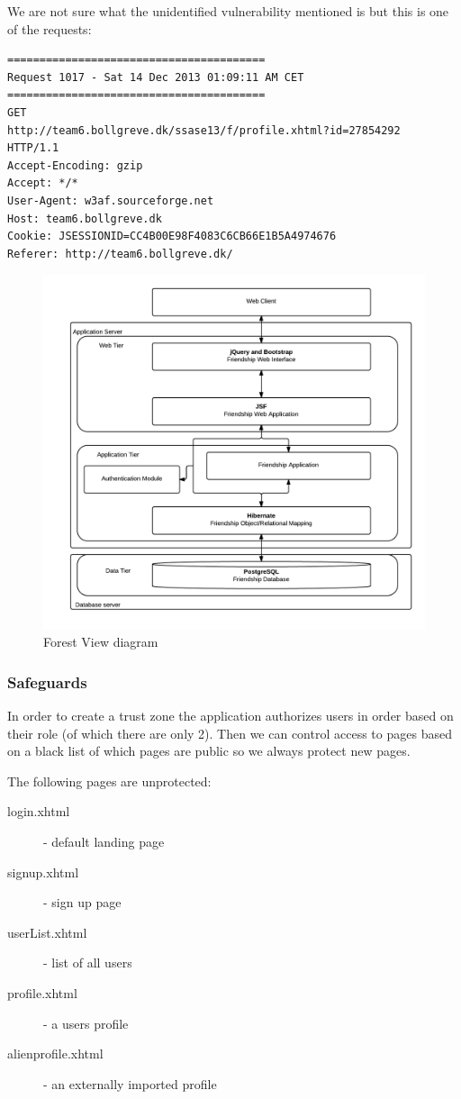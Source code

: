 \documentclass[a4paper]{article}
\begin{document}
We are not sure what the unidentified vulnerability mentioned is but this is one of the requests:
\begin{verbatim}
========================================
Request 1017 - Sat 14 Dec 2013 01:09:11 AM CET
========================================
GET 
http://team6.bollgreve.dk/ssase13/f/profile.xhtml?id=27854292 
HTTP/1.1
Accept-Encoding: gzip
Accept: */*
User-Agent: w3af.sourceforge.net
Host: team6.bollgreve.dk
Cookie: JSESSIONID=CC4B00E98F4083C6CB66E1B5A4974676
Referer: http://team6.bollgreve.dk/
\end{verbatim}


\begin{figure}[h!]
\centering
\includegraphics[scale=0.3]{ForestView}
\caption{Forest View diagram}
\label{fig:forest_view}
\end{figure}

\subsubsection{Safeguards}
In order to create a trust zone the application authorizes users in order based on their role (of which there are only 2). Then we can control access to pages based on a black list of which pages are public so we always protect new pages.

The following pages are unprotected:
\begin{description}
\item[login.xhtml] - default landing page
\item[signup.xhtml] - sign up page
\item[userList.xhtml] - list of all users
\item[profile.xhtml] - a users profile
\item[alienprofile.xhtml] - an externally imported profile
\end{description}
  
\end{document}
